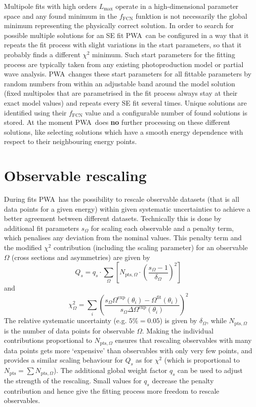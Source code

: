 \documentclass[a4paper,10pt]{article}
\def\PWA{\ttfamily PWA\rmfamily\ }
\begin{document}
Multipole fits with high orders $L_\mathrm{max}$ operate in a high-dimensional parameter space and
any found minimum in the $f_\mathrm{FCN}$ funktion is not necessarily the global minimum
representing the physically correct solution. In order to search for possible multiple
solutions for an SE fit \PWA can be configured in a way that it repeats the fit process with
slight variations in the start parameters, so that it probably finds a different $\chi^2$ minimum.
Such start parameters for the fitting process are typically taken from any existing photoproduction model or
partial wave analysis. \PWA changes these start parameters for all fittable parameters by random numbers
from within an adjustable band around the model solution (fixed multipoles that are parametrised in the fit process
always stay at their exact model values) and repeats every SE fit several times. Unique solutions 
are identified using their $f_\mathrm{FCN}$ value and a configurable number of found solutions is stored. 
At the moment \PWA does \textbf{no} further processing on these different solutions, like selecting solutions which 
have a smooth energy dependence with respect to their neighbouring energy points.

\section{Observable rescaling}

During fits \PWA has the possibility to rescale observable datasets (that is all data points for a given energy)
within given systematic uncertainties to achieve a better agreement between
different datasets. Technically this is done by additional fit parameters $s_\Omega$ for scaling each
observable and a penalty term, which penalises any deviation from the nominal values. This penalty term and the modified $\chi^2$
contribution (including the scaling parameter) for an observable $\Omega$ (cross sections and asymmetries) are given by
\begin{displaymath}
 Q_s = q_s\cdot \sum\limits_\Omega\left[ N_{\mathrm{pts},\Omega} \cdot \left(\frac{s_\Omega - 1}{\delta_\Omega}\right)^2\right]
\end{displaymath}
and
\begin{displaymath}
\chi_\Omega^2
= \sum\limits_i \left(
\frac
{s_\Omega \Omega^\mathrm{exp}(\theta_i) - \Omega^\mathrm{fit}(\theta_i)}
{s_\Omega\Delta \Omega^\mathrm{exp}(\theta_i)}
\right)^2
\end{displaymath}
The relative systematic uncertainty (e.g. $5\% = 0.05$) is given by $\delta_\Omega$, while $N_{\mathrm{pts},\Omega}$
is the number of data points for observable $\Omega$. Making the individual contributions proportional
to  $N_{\mathrm{pts},\Omega}$ ensures that rescaling observables with many data points gets more `expensive'
than observables with only very few points, and provides a similar scaling behaviour
for $Q_s$ as  for $\chi^2$ (which is proportional to $N_\mathrm{pts} = \sum N_{\mathrm{pts},\Omega} $).
The additional global weight factor $q_s$ can be used to adjust the strength of the rescaling. Small values for
$q_s$ decrease the penalty contribution and hence give the fitting process more freedom to rescale observables.
\end{document}
